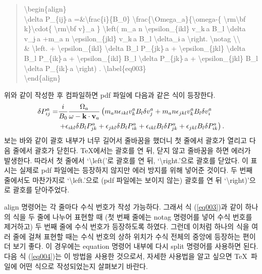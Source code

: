 \documentclass{gshs-report-v1.1}
\begin{document}
\begin{quote}
	{\textbackslash}begin\{align\}\\
	{\textbackslash}delta P\_\{ij\}$\hat{\ }$a =\&{\textbackslash}frac\{i\}\{B\_0\} {\textbackslash}frac\{{\textbackslash}Omega\_a\}\{{\textbackslash}omega-\{ {\textbackslash}rm{\textbackslash}bf k\}{\textbackslash}cdot\{ {\textbackslash}rm{\textbackslash}bf v\}\_a \} {\textbackslash}left( m\_a n {\textbackslash}epsilon\_\{ikl\} v\_k$\hat{\ }$a B\_l {\textbackslash}delta v\_j$\hat{\ }$a +m\_a n {\textbackslash}epsilon\_\{jkl\} v\_k$\hat{\ }$a B\_l {\textbackslash}delta\_i$\hat{\ }$a {\textbackslash}right. {\textbackslash}notag {\textbackslash}{\textbackslash} \\
	\& {\textbackslash}left. + {\textbackslash}epsilon\_\{ikl\} {\textbackslash}delta B\_l P\_\{jk\}$\hat{\ }$a + {\textbackslash}epsilon\_\{jkl\} {\textbackslash}delta B\_l P\_\{ik\}$\hat{\ }$a + {\textbackslash}epsilon\_\{ikl\} B\_l {\textbackslash}delta P\_\{jk\}$\hat{\ }$a + {\textbackslash}epsilon\_\{jkl\} B\_l {\textbackslash}delta P\_\{ik\}$\hat{\ }$a {\textbackslash}right) . {\textbackslash}label\{eq003\} \\
	{\textbackslash}end\{align\}
\end{quote}
위와 같이 작성한 후 컴파일하면 pdf 파일에 다음과 같은 식이 등장한다.
\begin{align}
\delta P_{ij}^a =&\frac{i}{B_0} \frac{\Omega_a}{\omega-{\rm\bf k}\cdot{\rm\bf v}_a} \left( m_a n \epsilon_{ikl} v_k^a B_l \delta v_j^a +m_a n \epsilon_{jkl} v_k^a B_l \delta v_i^a \right. \notag\\
&\left. +\epsilon_{ikl} \delta B_l P_{jk}^a +\epsilon_{jkl} \delta B_l P_{ik}^a +\epsilon_{ikl} B_l \delta P_{jk}^a +\epsilon_{jkl} B_l \delta P_{ik}^a \right) . \label{eq003}
\end{align}
보는 바와 같이 괄호 내부가 너무 길어서 줄바꿈을 했더니 첫 줄에서 괄호가 열리고 다음 줄에서 괄호가 닫힌다. \TeX 에서는 괄호를 연 뒤, 닫지 않고 줄바꿈을 하면 에러가 발생한다. 따라서 첫 줄에서 `{\textbackslash}left('로 괄호를 연 뒤, `{\textbackslash}right.'으로 괄호를 닫았다. 이 표시는 실제로 pdf 파일에는 등장하지 않지만 에러 방지를 위해 넣어준 것이다. 두 번째 줄에서도 마찬가지로 `{\textbackslash}left.'으로 (pdf 파일에는 보이지 않는) 괄호를 연 뒤 `{\textbackslash}right)'으로 괄호를 닫아주었다.

align 명령어는 각 줄마다 수식 번호가 작성 가능하다. 그래서 식 (\ref{eq003})과 같이 하나의 식을 두 줄에 나누어 표현할 때 (첫 번째 줄에는 notag 명령어를 넣어 수식 번호를 제거하고) 두 번째 줄에 수식 번호가 등장하도록 하였다. 그런데 이처럼 하나의 식을 여러 줄에 걸쳐 표현할 때는 수식 번호의 상하 위치가 수식 전체의 중앙에 등장하는 편이 더 보기 좋다. 이 경우에는 equation 명령어 내부에 다시 split 명령어를 사용하면 된다. 다음 식 (\ref{eq004})는 이 방법을 사용한 것으로서, 자세한 사용법을 알고 싶으면 \TeX\ 파일에 어떤 식으로 작성되었는지 살펴보기 바란다.
\end{document}

